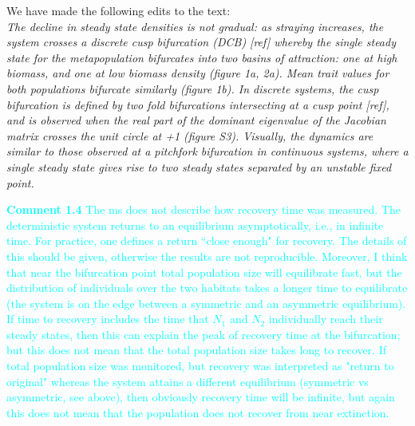\documentclass[ucm,12pt]{ucletter}
\newcounter{section}
\begin{document}
\begin{letter}

\noindent We have made the following edits to the text:\\
 \emph{The decline in steady state densities is not gradual: as straying increases, the system crosses a discrete cusp bifurcation (DCB) [ref] whereby the single steady state for the metapopulation bifurcates into two basins of attraction: one at high biomass, and one at low biomass density (figure 1a, 2a).
Mean trait values for both populations bifurcate similarly (figure 1b). 
In discrete systems, the cusp bifurcation is defined by two fold bifurcations intersecting at a cusp point [ref], and is observed when the real part of the dominant eigenvalue of the Jacobian matrix crosses the unit circle at +1 (figure S3).
Visually, the dynamics are similar to those observed at a pitchfork bifurcation in continuous systems, where a single steady state gives rise to two steady states separated by an unstable fixed point.
}


\noindent \textcolor{cyan}{
{\bf Comment 1.4} The ms does not describe how recovery time was measured. The deterministic system returns to an equilibrium asymptotically, i.e., in infinite time. For practice, one defines a return ``close enough" for recovery. The details of this should be given, otherwise the results are not reproducible. Moreover, I think that near the bifurcation point total population size will equilibrate fast, but the distribution of individuals over the two habitats takes a longer time to equilibrate (the system is on the edge between a symmetric and an asymmetric equilibrium). If time to recovery includes the time that $N_1$ and $N_2$ individually reach their steady states, then this can explain the peak of recovery time at the bifurcation; but this does not mean that the total population size takes long to recover. If total population size was monitored, but recovery was interpreted as "return to original" whereas the system attains a different equilibrium (symmetric vs asymmetric, see above), then obviously recovery time will be infinite, but again this does not mean that the population does not recover from near extinction.
}


\end{letter}
\end{document}
